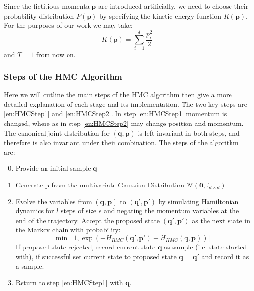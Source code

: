 \documentclass[12pt]{article}
\begin{document}
            Since the fictitious momenta $\bm{p}$ are introduced artificially, we need to choose their probability distribution $P\left(\bm{p}\right)$ by specifying the kinetic energy function $K\left(\bm{p}\right)$. For the purposes of our work we may take:
            \begin{equation}
                \label{eq:HMCQuadraticKineticEnergy}
                K\left(\bm{p}\right) = \sum_{i=1}^{d}\frac{p_i^2}{2}
            \end{equation}
            and $T=1$ from now on.

            \subsubsection{Steps of the HMC Algorithm}
            Here we will outline the main steps of the HMC algorithm then give a more detailed explanation of each stage and its implementation. The two key steps are \ref{en:HMCStep1} and \ref{en:HMCStep2}. In step \ref{en:HMCStep1} momentum is changed, where as in step \ref{en:HMCStep2} may change position and momentum. The canonical joint distribution for $\left(\bm{q},\bm{p}\right)$ is left invariant in both steps, and therefore is also invariant under their combination. The steps of the algorithm are:
            \begin{enumerate}
                \setcounter{enumi}{-1}
                \item \label{en:HMCStep0} Provide an initial sample $\bm{q}$
                \item \label{en:HMCStep1} Generate $\bm{p}$ from the multivariate Gaussian Distribution $\mathcal{N}\left(\bm{0},I_{d\times d}\right)$ 
                \item \label{en:HMCStep2} Evolve the variables from $\left(\bm{q},\bm{p}\right)$ to $\left(\bm{q'},\bm{p}'\right)$ by simulating Hamiltonian dynamics for $l$ steps of size $\epsilon$ and negating the momentum variables at the end of the trajectory. Accept the proposed state $\left(\bm{q}',\bm{p}'\right)$ as the next state in the Markov chain with probability:
                        \begin{equation*}
                            \min{\left[1,\exp{\left(-H_{HMC}\left(\bm{q}',\bm{p}'\right)+ \allowbreak H_{HMC}\left(\bm{q},\bm{p}\right)\right)}\right]}
                        \end{equation*}
                        If proposed state rejected, record current state $\bm{q}$ as sample (i.e. state started with), if successful set current state to proposed state $\bm{q}$ = $\bm{q}'$ and record it as a sample.
                \item \label{en:HMCStep5} Return to step \ref{en:HMCStep1} with $\bm{q}$.
            \end{enumerate}
\end{document}
